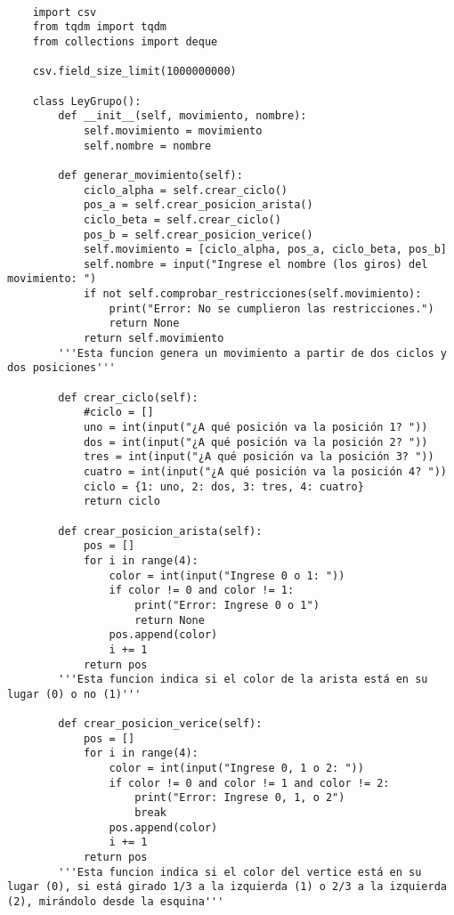 \begin{lstlisting}

    import csv
    from tqdm import tqdm
    from collections import deque
    
    csv.field_size_limit(1000000000)
    
    class LeyGrupo():
        def __init__(self, movimiento, nombre):
            self.movimiento = movimiento
            self.nombre = nombre
        
        def generar_movimiento(self):
            ciclo_alpha = self.crear_ciclo()
            pos_a = self.crear_posicion_arista()
            ciclo_beta = self.crear_ciclo()
            pos_b = self.crear_posicion_verice()
            self.movimiento = [ciclo_alpha, pos_a, ciclo_beta, pos_b]
            self.nombre = input("Ingrese el nombre (los giros) del movimiento: ")
            if not self.comprobar_restricciones(self.movimiento):
                print("Error: No se cumplieron las restricciones.")
                return None
            return self.movimiento
        '''Esta funcion genera un movimiento a partir de dos ciclos y dos posiciones'''
        
        def crear_ciclo(self):
            #ciclo = []
            uno = int(input("¿A qué posición va la posición 1? "))
            dos = int(input("¿A qué posición va la posición 2? "))
            tres = int(input("¿A qué posición va la posición 3? "))
            cuatro = int(input("¿A qué posición va la posición 4? "))
            ciclo = {1: uno, 2: dos, 3: tres, 4: cuatro}
            return ciclo
        
        def crear_posicion_arista(self):
            pos = []
            for i in range(4):
                color = int(input("Ingrese 0 o 1: "))
                if color != 0 and color != 1:
                    print("Error: Ingrese 0 o 1")
                    return None
                pos.append(color)
                i += 1
            return pos
        '''Esta funcion indica si el color de la arista está en su lugar (0) o no (1)'''
    
        def crear_posicion_verice(self):
            pos = []
            for i in range(4):
                color = int(input("Ingrese 0, 1 o 2: "))
                if color != 0 and color != 1 and color != 2:
                    print("Error: Ingrese 0, 1, o 2")
                    break
                pos.append(color)
                i += 1
            return pos
        '''Esta funcion indica si el color del vertice está en su lugar (0), si está girado 1/3 a la izquierda (1) o 2/3 a la izquierda (2), mirándolo desde la esquina'''
        

\end{lstlisting}
